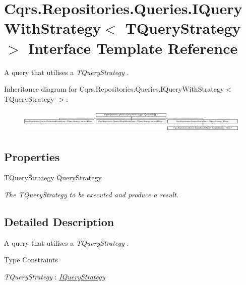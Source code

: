 \hypertarget{interfaceCqrs_1_1Repositories_1_1Queries_1_1IQueryWithStrategy}{}\section{Cqrs.\+Repositories.\+Queries.\+I\+Query\+With\+Strategy$<$ T\+Query\+Strategy $>$ Interface Template Reference}
\label{interfaceCqrs_1_1Repositories_1_1Queries_1_1IQueryWithStrategy}


A query that utilises a {\itshape T\+Query\+Strategy} .  


Inheritance diagram for Cqrs.\+Repositories.\+Queries.\+I\+Query\+With\+Strategy$<$ T\+Query\+Strategy $>$\+:\begin{figure}[H]
\begin{center}
\leavevmode
\includegraphics[height=1.117764cm]{interfaceCqrs_1_1Repositories_1_1Queries_1_1IQueryWithStrategy}
\end{center}
\end{figure}
\subsection*{Properties}
\begin{DoxyCompactItemize}
\item 
T\+Query\+Strategy \hyperlink{interfaceCqrs_1_1Repositories_1_1Queries_1_1IQueryWithStrategy_a48ee82d7f6ff31e0ce25c09184982e34_a48ee82d7f6ff31e0ce25c09184982e34}{Query\+Strategy}
\begin{DoxyCompactList}\small\item\em The {\itshape T\+Query\+Strategy}  to be executed and produce a result. \end{DoxyCompactList}\end{DoxyCompactItemize}


\subsection{Detailed Description}
A query that utilises a {\itshape T\+Query\+Strategy} . 

\begin{Desc}
\item[Type Constraints]\begin{description}
\item[{\em T\+Query\+Strategy} : {\em \hyperlink{interfaceCqrs_1_1Repositories_1_1Queries_1_1IQueryStrategy}{I\+Query\+Strategy}}]\end{description}
\end{Desc}



